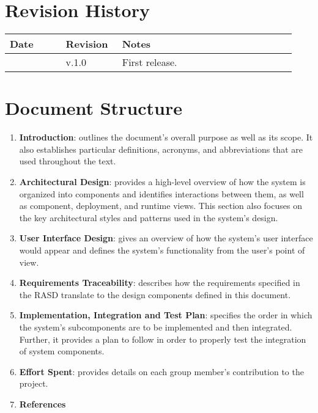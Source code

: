 \section{Revision History}

\begin{center}
	\begin{longtable}{@{}p{0.18\linewidth} p{0.18\linewidth} p{0.57\linewidth}@{}}
		\toprule
		\textbf{Date}   & \textbf{Revision} & \textbf{Notes}\\
		\midrule
        \date{}      & v.1.0             & First release.\\
		\bottomrule
	\end{longtable}
\end{center}

\printbibliography[title={Reference Documents},keyword=intro, heading=subbibnumbered]

\section{Document Structure}

\begin{enumerate}
    \item \textbf{Introduction}: outlines the document's overall purpose as well as its scope. It also establishes particular definitions, acronyms, and abbreviations that are used throughout the text.
    \item \textbf{Architectural Design}: provides a high-level overview of how the system is organized into components and identifies interactions between them, as well as component, deployment, and runtime views. This section also focuses on the key architectural styles and patterns used in the system's design.
    \item \textbf{User Interface Design}: gives an overview of how the system's user interface would appear and defines the system's functionality from the user's point of view.
    \item \textbf{Requirements Traceability}: describes how the requirements specified in the RASD translate to the design components defined in this document.
    \item \textbf{Implementation, Integration and Test Plan}: specifies the order in which the system's subcomponents are to be implemented and then integrated. Further, it provides a plan to follow in order to properly test the integration of system components.
    \item \textbf{Effort Spent}: provides details on each group member's contribution to the project.
    \item \textbf{References}
\end{enumerate}
